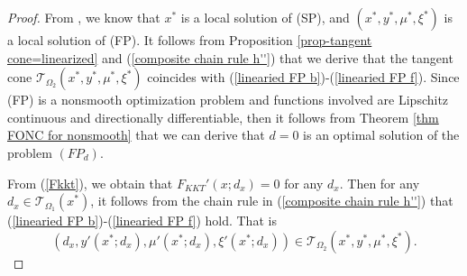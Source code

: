 \documentclass[11pt]{article}
\theoremstyle{definition}
\theoremstyle{remark}
\numberwithin{equation}{section}
\begin{document}
\begin{proof}
From \cite[Remark 3.6]{Liu 25}, we know that $x^*$ is a local solution of (SP), and $(x^*,y^*,\mu^*,\xi^*)$ is a local solution of (FP).
It follows from Proposition \ref{prop-tangent cone=linearized} and (\ref{composite chain rule h''}) that we derive that  the tangent cone $\mathcal{T}_{\Omega_2}(x^*,y^*,\mu^*,\xi^*)$ coincides with (\ref{linearied FP b})-({\ref{linearied FP f}}).
  Since  (FP) is a nonsmooth optimization problem  and functions involved are Lipschitz continuous and
  directionally differentiable, then it follows from Theorem \ref{thm FONC for nonsmooth} that we can derive that $d=0$ is an optimal solution of the problem  $(FP_{d})$.

From (\ref{Fkkt}), we obtain that $F_{KKT}'(x;d_x)=0$ for any $d_x$.
Then for any $d_x\in \mathcal{T}_{\Omega_1}(x^*)$, it follows from the chain rule in  (\ref{composite chain rule h''}) that  (\ref{linearied FP b})-(\ref{linearied FP f}) hold. That is
 $$(d_x,y'(x^*;d_x),\mu'(x^*;d_x),\xi'(x^*;d_x))\in \mathcal{T}_{\Omega_2}(x^*,y^*,\mu^*,\xi^*).$$


\end{proof}
\end{document}
